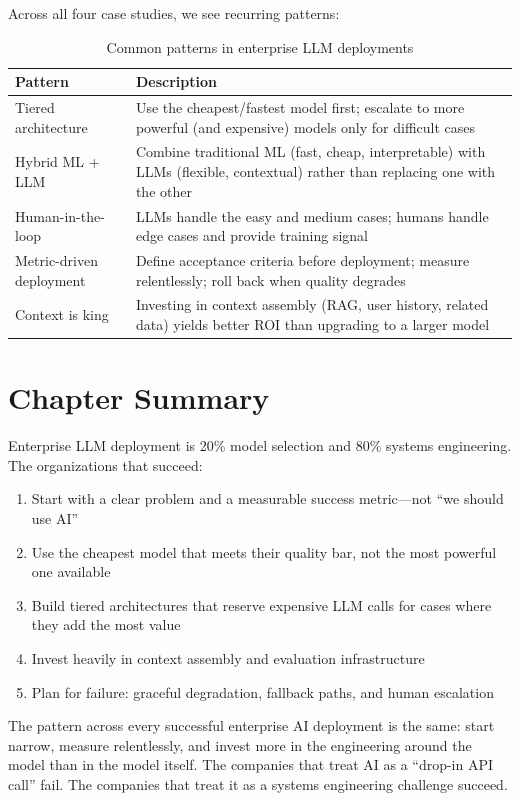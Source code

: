 Across all four case studies, we see recurring patterns:

\begin{table}[htbp]
\centering
\caption{Common patterns in enterprise LLM deployments}
\label{tab:enterprise-patterns}
\begin{tabularx}{\textwidth}{lX}
\toprule
\textbf{Pattern} & \textbf{Description} \\
\midrule
Tiered architecture & Use the cheapest/fastest model first; escalate to more powerful (and expensive) models only for difficult cases \\
Hybrid ML + LLM & Combine traditional ML (fast, cheap, interpretable) with LLMs (flexible, contextual) rather than replacing one with the other \\
Human-in-the-loop & LLMs handle the easy and medium cases; humans handle edge cases and provide training signal \\
Metric-driven deployment & Define acceptance criteria before deployment; measure relentlessly; roll back when quality degrades \\
Context is king & Investing in context assembly (RAG, user history, related data) yields better ROI than upgrading to a larger model \\
\bottomrule
\end{tabularx}
\end{table}

\section{Chapter Summary}

\noindent
Enterprise LLM deployment is 20\% model selection and 80\% systems engineering. The organizations that succeed:

\begin{enumerate}[leftmargin=*]
    \item Start with a clear problem and a measurable success metric---not ``we should use AI''
    \item Use the cheapest model that meets their quality bar, not the most powerful one available
    \item Build tiered architectures that reserve expensive LLM calls for cases where they add the most value
    \item Invest heavily in context assembly and evaluation infrastructure
    \item Plan for failure: graceful degradation, fallback paths, and human escalation
\end{enumerate}

\begin{keytakeaway}
The pattern across every successful enterprise AI deployment is the same: start narrow, measure relentlessly, and invest more in the engineering around the model than in the model itself. The companies that treat AI as a ``drop-in API call'' fail. The companies that treat it as a systems engineering challenge succeed.
\end{keytakeaway}
